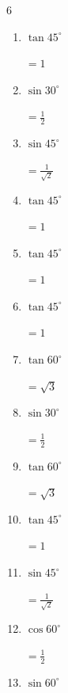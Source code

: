 \begin{multicols}{6}
\begin{enumerate}
        $\displaystyle =\frac{1}{\sqrt{2}}$

  \item $\displaystyle \tan{45^\circ}$

        $\displaystyle =1$

  \item $\displaystyle \sin{30^\circ}$

        $\displaystyle =\frac{1}{2}$

  \item $\displaystyle \sin{45^\circ}$

        $\displaystyle =\frac{1}{\sqrt{2}}$

  \item $\displaystyle \tan{45^\circ}$

        $\displaystyle =1$

  \item $\displaystyle \tan{45^\circ}$

        $\displaystyle =1$

  \item $\displaystyle \tan{45^\circ}$

        $\displaystyle =1$

  \item $\displaystyle \tan{60^\circ}$

        $\displaystyle =\sqrt{3}$

  \item $\displaystyle \sin{30^\circ}$

        $\displaystyle =\frac{1}{2}$

  \item $\displaystyle \tan{60^\circ}$

        $\displaystyle =\sqrt{3}$

\columnbreak %

\resetques

  \item $\displaystyle \tan{45^\circ}$

        $\displaystyle =1$

  \item $\displaystyle \sin{45^\circ}$

        $\displaystyle =\frac{1}{\sqrt{2}}$

  \item $\displaystyle \cos{60^\circ}$

        $\displaystyle =\frac{1}{2}$

  \item $\displaystyle \sin{60^\circ}$


\end{enumerate}
\end{multicols}
